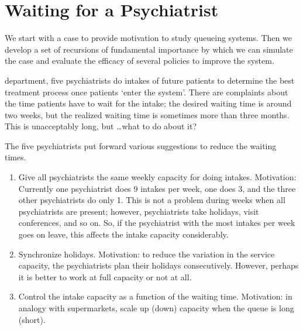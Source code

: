 \documentclass[queueing-book.tex]{subfiles}
\begin{document}
\section{Waiting for a Psychiatrist}
\label{sec:constr-discr-time}


We start with a case to provide motivation to study queueing systems.
Then we develop a set of recursions of fundamental importance by which we can simulate the case and evaluate the efficacy of several policies to improve the system.



 department, five psychiatrists do intakes of future patients to determine the best treatment process once patients `enter the system'.
There are complaints about the time patients have to wait for the intake; the desired waiting time is around two weeks, but the realized waiting time is sometimes more than three months.
This is  unacceptably long, but \ldots what to do about it?

The five psychiatrists  put forward various suggestions to reduce the waiting times.
\begin{enumerate}
\item Give all psychiatrists the same weekly capacity for doing intakes.
  Motivation: Currently one psychiatrist does 9 intakes per week, one does 3, and the three other psychiatrists do only 1.
  This is not a problem during weeks when all psychiatrists are present; however, psychiatrists take holidays, visit conferences, and so on.
  So, if the psychiatrist with the most intakes per week goes on leave, this affects the intake capacity considerably.
\item Synchronize holidays.
  Motivation: to reduce the variation in the service capacity, the psychiatrists plan their holidays consecutively.
  However, perhaps it is better to work at full capacity or not at all.
\item Control  the intake capacity as a function of the waiting time.
 Motivation: in analogy with supermarkets,  scale up (down) capacity when the queue is long (short).
\end{enumerate}
\end{document}
